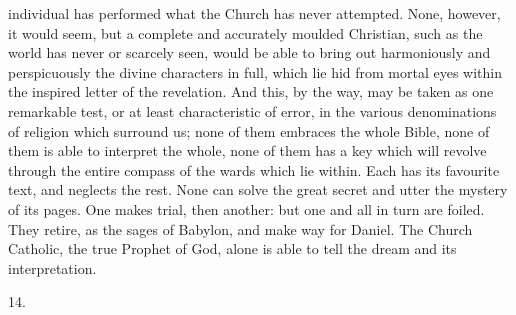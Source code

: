 individual has performed what the Church has never attempted. None,
however, it would seem, but a complete and accurately moulded
Christian, such as the world has never or scarcely seen, would be able
to bring out harmoniously and perspicuously the divine characters in
full, which lie hid from mortal eyes within the inspired letter of the
revelation. And this, by the way, may be taken as one remarkable test,
or at least characteristic of error, in the various denominations of
religion which surround us; none of them embraces the whole Bible,
none of them is able to interpret the whole, none of them has a key
which will revolve through the entire compass of the wards which lie
within. Each has its favourite text, and neglects the rest. None can
solve the great secret and utter the mystery of its pages. One makes
trial, then another: but one and all in turn are foiled. They retire,
as the sages of Babylon, and make way for Daniel. The Church Catholic,
the true Prophet of God, alone is able to tell the dream and its
interpretation.

14.

